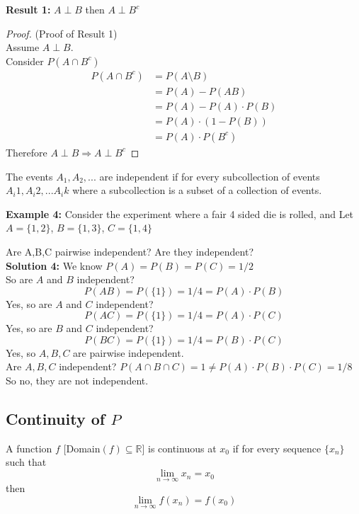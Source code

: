 \documentclass[12pt, twoside]{article}
\begin{document}
\textbf{Result 1:} $A \perp B$ then $A \perp B^c$
\begin{proof} (Proof of Result 1)\\
	Assume $A \perp B$.\\
	Consider $P(A \cap B^c)$
	\begin{align*}
		P(A \cap B^c) &= P(A \setminus B)\\
		&= P(A) - P(AB)\\
		&= P(A) - P(A) \cdot P(B)\\
		&= P(A) \cdot (1 - P(B))\\
		&= P(A) \cdot P(B^c)
	\end{align*}
	Therefore $A \perp B \Longrightarrow A \perp B^c$
\end{proof}

\begin{tcolorbox}[title=Definition: General Definition of Independent Events]
	The events $A_1, A_2, ...$ are independent if for every subcollection of events $A_i1, A_i2, ... A_ik$ where a subcollection is a subset of a collection of events.
\end{tcolorbox}

\textbf{Example 4:} Consider the experiment where a fair 4 sided die is rolled, and Let $A = \{ 1,2 \}$, $B = \{ 1,3 \}$, $C = \{ 1,4 \}$

Are A,B,C pairwise independent? Are they independent?
\\
\textbf{Solution 4:} We know $P(A) = P(B) = P(C) = 1/2$\\
So are $A$ and $B$ independent?
$$P(AB) = P(\{ 1 \}) = 1/4 = P(A)\cdot P(B)$$
Yes, so are $A$ and $C$ independent?
$$P(AC) = P(\{ 1 \}) = 1/4 = P(A)\cdot P(C)$$
Yes, so are $B$ and $C$ independent?
$$P(BC) = P(\{ 1 \}) = 1/4 = P(B)\cdot P(C)$$
Yes, so $A, B, C$ are pairwise independent.\\
Are $A,B,C$ independent?
$P(A\cap B \cap C) = 1 \neq P(A) \cdot P(B) \cdot P(C) = 1/8$
So no, they are not independent.

\subsection{Continuity of $P$}

\begin{tcolorbox}[title=Definition: Continuous]
	A function $f$ [Domain$(f) \subseteq \mathbb{R}$] is continuous at $x_0$ if for every sequence $\{x_n\}$ such that $$\lim_{n\to\infty} x_n = x_0$$ then $$\lim_{n\to\infty} f(x_n) = f(x_0)$$
\end{tcolorbox}
\end{document}
